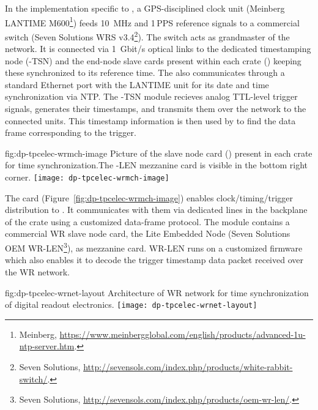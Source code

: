In the implementation specific to , a GPS-disciplined 
clock unit (Meinberg LANTIME M600\footnote{Meinberg\texttrademark{}, \url{https://www.meinbergglobal.com/english/products/advanced-1u-ntp-server.htm}.}) feeds \SI{10}{MHz} and \num{1}\,PPS reference signals to a commercial  switch (Seven Solutions WRS v3.4\footnote{Seven Solutions\texttrademark{}, \url{http://sevensols.com/index.php/products/white-rabbit-switch/}.}). The switch acts as grandmaster of the  network. It is connected via \SI{1}{Gbit/s} optical links to the dedicated  timestamping node (-TSN) and the  end-node slave cards present within each  crate () keeping these synchronized to its reference time. The  also communicates through a standard Ethernet port with the LANTIME unit for its date and time synchronization via NTP. The -TSN module recieves analog TTL-level trigger signals, generates their timestamps, and transmits them over the  network to the connected  units. This timestamp information is then used by  to find the data frame corresponding to the trigger. 

\begin{dunefigure}{fig:dp-tpcelec-wrmch-image}
{Picture of the  slave node card () present in each  crate for time synchronization.The -LEN mezzanine card is visible in the bottom right corner.}
\texttt{[image: dp-tpcelec-wrmch-image]}
\end{dunefigure}

The  card (Figure~\ref{fig:dp-tpcelec-wrmch-image}) enables clock/timing/trigger distribution to . It communicates with them via dedicated lines in the backplane of the  crate using a customized data-frame protocol. The module contains a commercial WR slave node card, the  Lite Embedded Node (Seven Solutions OEM WR-LEN\footnote{Seven Solutions\texttrademark{}, \url{http://sevensols.com/index.php/products/oem-wr-len/}.}), as mezzanine card. WR-LEN runs on a customized firmware which also enables it to decode the trigger timestamp data packet received over the WR network.

\begin{dunefigure}{fig:dp-tpcelec-wrnet-layout}
{Architecture of WR network for time synchronization of digital readout electronics.}
\texttt{[image: dp-tpcelec-wrnet-layout]}
\end{dunefigure}

